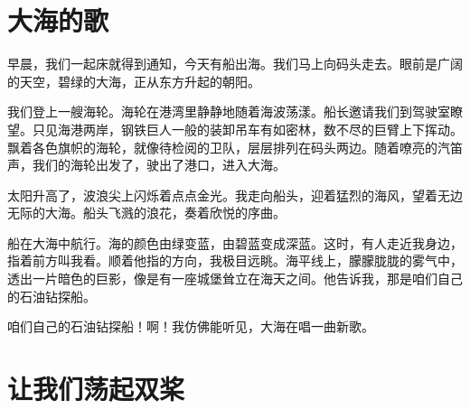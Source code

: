 \documentclass[12pt,UTF-8,openany]{ctexbook}
\begin{document}
\chapter{大海的歌}

\begin{large}
    
    早晨，我们一起床就得到通知，今天有船出海。我们马上向码头走去。眼前是广阔的天空，碧绿的大海，正从东方升起的朝阳。
    
    我们登上一艘海轮。海轮在港湾里静静地随着海波荡漾。船长邀请我们到驾驶室瞭望。只见海港两岸，钢铁巨人一般的装卸吊车有如密林，数不尽的巨臂上下挥动。飘着各色旗帜的海轮，就像待检阅的卫队，层层排列在码头两边。随着嘹亮的汽笛声，我们的海轮出发了，驶出了港口，进入大海。
    
    太阳升高了，波浪尖上闪烁着点点金光。我走向船头，迎着猛烈的海风，望着无边无际的大海。船头飞溅的浪花，奏着欣悦的序曲。
    
    船在大海中航行。海的颜色由绿变蓝，由碧蓝变成深蓝。这时，有人走近我身边，指着前方叫我看。顺着他指的方向，我极目远眺。海平线上，朦朦胧胧的雾气中，透出一片暗色的巨影，像是有一座城堡耸立在海天之间。他告诉我，那是咱们自己的石油钻探船。
    
    咱们自己的石油钻探船！啊！我仿佛能听见，大海在唱一曲新歌。
    
\end{large}



\chapter{让我们荡起双桨}
\end{document}
